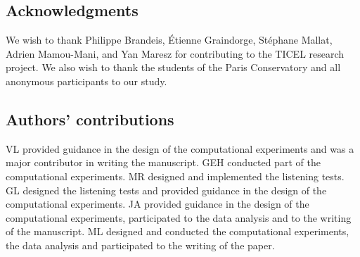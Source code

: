 \documentclass{bmcart}
\newcommand{\nmu}{}
\begin{document}
\begin{backmatter}
\subsection*{\nmu Acknowledgments}

We wish to thank Philippe Brandeis, \'{E}tienne Graindorge, St\'{e}phane Mallat, Adrien Mamou-Mani, and Yan Maresz for contributing to the TICEL research project.
We also wish to thank the students of the Paris Conservatory and all anonymous participants to our study.

\subsection*{Authors' contributions}

VL provided guidance in the design of the computational experiments and was a major contributor in writing the manuscript. GEH conducted part of the computational experiments. MR designed and implemented the listening tests. GL designed the listening tests and provided guidance in the design of the computational experiments. JA provided guidance in the design of the computational experiments, participated to the data analysis and  to the writing of the manuscript. ML designed and conducted the computational experiments, the data analysis and participated to the writing of the paper.





\end{backmatter}
\end{document}
